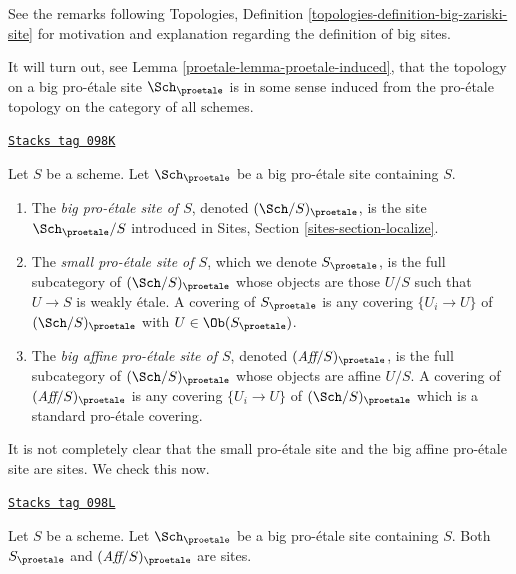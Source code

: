 See the remarks following
Topologies, Definition \ref{topologies-definition-big-zariski-site}
for motivation and explanation regarding the definition of big sites.

\medskip\noindent
It will turn out, see Lemma \ref{proetale-lemma-proetale-induced}, that the
topology on a big pro-\'etale site $\Sch_\proetale$ is in some sense
induced from the pro-\'etale topology on the category of all schemes.

\begin{definition}
\label{proetale-definition-big-small-proetale}
\href{https://stacks.math.columbia.edu/tag/098K}{\texttt{Stacks tag 098K}}

Let $S$ be a scheme. Let $\Sch_\proetale$ be a big pro-\'etale
site containing $S$.
\begin{enumerate}
\item The {\it big pro-\'etale site of $S$}, denoted
$(\Sch/S)_\proetale$, is the site $\Sch_\proetale/S$
introduced in Sites, Section \ref{sites-section-localize}.
\item The {\it small pro-\'etale site of $S$}, which we denote
$S_\proetale$, is the full subcategory of $(\Sch/S)_\proetale$
whose objects are those $U/S$ such that $U \to S$ is weakly \'etale.
A covering of $S_\proetale$ is any covering $\{U_i \to U\}$ of
$(\Sch/S)_\proetale$ with $U \in \Ob(S_\proetale)$.
\item The {\it big affine pro-\'etale site of $S$}, denoted
$(\textit{Aff}/S)_\proetale$, is the full subcategory of
$(\Sch/S)_\proetale$ whose objects are affine $U/S$.
A covering of $(\textit{Aff}/S)_\proetale$ is any covering
$\{U_i \to U\}$ of $(\Sch/S)_\proetale$ which is a
standard pro-\'etale covering.
\end{enumerate}
\end{definition}

It is not completely clear that the small pro-\'etale site and
the big affine pro-\'etale site are sites. We check this now.

\begin{lemma}
\label{proetale-lemma-verify-site-proetale}
\href{https://stacks.math.columbia.edu/tag/098L}{\texttt{Stacks tag 098L}}

Let $S$ be a scheme. Let $\Sch_\proetale$ be a big pro-\'etale site
containing $S$. Both $S_\proetale$ and $(\textit{Aff}/S)_\proetale$ are sites.
\end{lemma}

